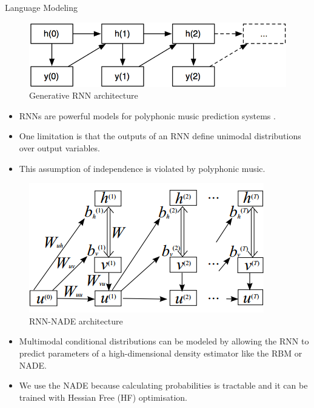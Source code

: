 \documentclass[final]{beamer}
\newlength{\onecolwid}
\begin{document}
\begin{frame}[t]
\begin{columns}[t]
\begin{column}{\onecolwid}


\begin{block}{Language Modeling}

\begin{figure}
\includegraphics[width=0.8\linewidth]{RNN.png}
\caption{Generative RNN architecture}
\end{figure}
\begin{itemize}
\item RNNs are powerful models for polyphonic music prediction systems \cite{boulanger2012modeling}. 
\item One limitation is that the outputs of an RNN define unimodal distributions over output variables. 
\item This assumption of independence is violated by polyphonic music. 
\end{itemize}
\begin{figure}
\includegraphics[width=0.8\linewidth]{rnnrbm.png}
\caption{RNN-NADE architecture}
\end{figure}
\begin{itemize}
\item Multimodal conditional distributions can be modeled by allowing the RNN to predict parameters of a high-dimensional density estimator like the RBM or NADE. 
\item We use the NADE because calculating probabilities is tractable and it can be trained with Hessian Free (HF) optimisation. 
\end{itemize}
\end{block}



\end{column}
\end{columns}
\end{frame}
\end{document}
